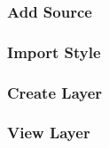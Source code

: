 \subsubsection{Add Source}

\subsubsection{Import Style}

\subsubsection{Create Layer}

\subsubsection{View Layer}